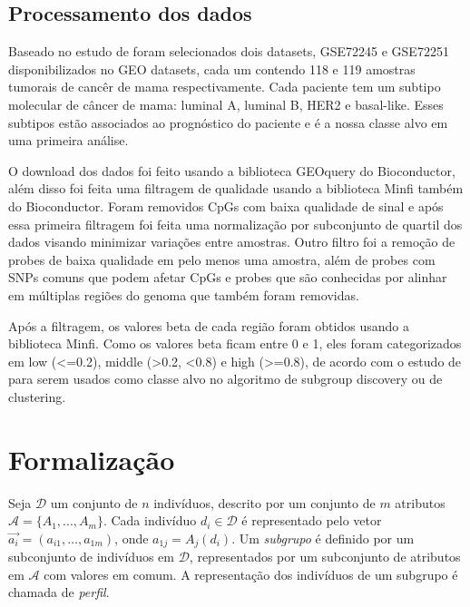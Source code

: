 \documentclass{article}
\begin{document}
\subsection{Processamento dos dados}

Baseado no estudo de \cite{jeschke2017cancers} foram selecionados dois datasets, GSE72245 e GSE72251 disponibilizados no GEO datasets, cada um contendo 118 e 119 amostras tumorais de cancêr de mama respectivamente. Cada paciente tem um subtipo molecular de câncer de mama: luminal A, luminal B, HER2 e basal-like. Esses subtipos estão associados ao prognóstico do paciente e é a nossa classe alvo em uma primeira análise.

O download dos dados foi feito usando a biblioteca GEOquery do Bioconductor, além disso foi feita uma filtragem de qualidade usando a biblioteca Minfi também do Bioconductor. Foram removidos CpGs com baixa qualidade de sinal e após essa primeira filtragem foi feita uma normalização por subconjunto de quartil dos dados visando minimizar variações entre amostras. Outro filtro foi a remoção de probes de baixa qualidade em pelo menos uma amostra, além de probes com SNPs comuns que podem afetar CpGs e probes que são conhecidas por alinhar em  múltiplas regiões do genoma que também foram removidas.

Após a filtragem, os valores beta de cada região foram obtidos usando a biblioteca Minfi. Como os valores beta ficam entre 0 e 1, eles foram categorizados em low (<=0.2), middle (>0.2, <0.8) e high (>=0.8), de acordo com o estudo de \cite{du2010beta} para serem usados como classe alvo no algoritmo de subgroup discovery ou de clustering.



\section{Formalização}



Seja $\mathcal{D}$ um conjunto de $n$ indivíduos, descrito por um conjunto de $m$ atributos $ \mathcal{A} = \{A_1, ..., A_m\}$. Cada indivíduo $d_i \in \mathcal{D}$ é representado pelo vetor $\vec{a_i} = (a_{i1},\dots,a_{1m})$, onde $a_{1j} =  A_j(d_i)$. Um {\it subgrupo} é definido por um subconjunto de indivíduos em $\mathcal{D}$, representados por um subconjunto de atributos em $\mathcal{A}$ com valores em comum. A representação dos indivíduos de um subgrupo é chamada de {\it perfil}.  
\end{document}
